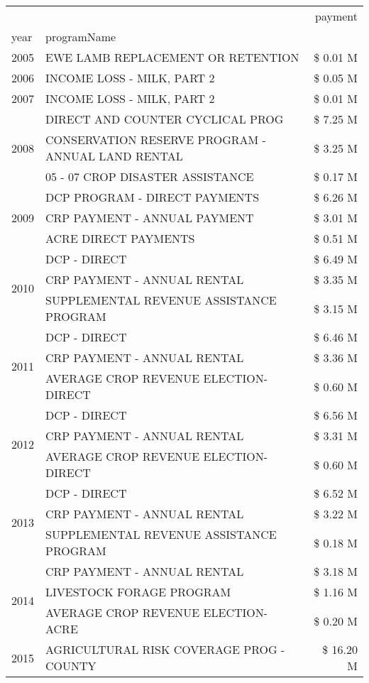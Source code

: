 \begin{tabular}{llr}
\toprule
 &  & payment \\
year & programName &  \\
\midrule
2005 & EWE LAMB REPLACEMENT OR RETENTION & \$ 0.01 M \\
\cline{1-3}
2006 & INCOME LOSS - MILK, PART 2 & \$ 0.05 M \\
\cline{1-3}
2007 & INCOME LOSS - MILK, PART 2 & \$ 0.01 M \\
\cline{1-3}
\multirow[t]{3}{*}{2008} & DIRECT AND COUNTER CYCLICAL PROG & \$ 7.25 M \\
 & CONSERVATION RESERVE PROGRAM - ANNUAL LAND RENTAL & \$ 3.25 M \\
 & 05 - 07 CROP DISASTER ASSISTANCE & \$ 0.17 M \\
\cline{1-3}
\multirow[t]{3}{*}{2009} & DCP PROGRAM - DIRECT PAYMENTS & \$ 6.26 M \\
 & CRP PAYMENT - ANNUAL PAYMENT & \$ 3.01 M \\
 & ACRE DIRECT PAYMENTS & \$ 0.51 M \\
\cline{1-3}
\multirow[t]{3}{*}{2010} & DCP - DIRECT & \$ 6.49 M \\
 & CRP PAYMENT - ANNUAL RENTAL & \$ 3.35 M \\
 & SUPPLEMENTAL REVENUE ASSISTANCE PROGRAM & \$ 3.15 M \\
\cline{1-3}
\multirow[t]{3}{*}{2011} & DCP - DIRECT & \$ 6.46 M \\
 & CRP PAYMENT - ANNUAL RENTAL & \$ 3.36 M \\
 & AVERAGE CROP REVENUE ELECTION-DIRECT & \$ 0.60 M \\
\cline{1-3}
\multirow[t]{3}{*}{2012} & DCP - DIRECT & \$ 6.56 M \\
 & CRP PAYMENT - ANNUAL RENTAL & \$ 3.31 M \\
 & AVERAGE CROP REVENUE ELECTION-DIRECT & \$ 0.60 M \\
\cline{1-3}
\multirow[t]{3}{*}{2013} & DCP - DIRECT & \$ 6.52 M \\
 & CRP PAYMENT - ANNUAL RENTAL & \$ 3.22 M \\
 & SUPPLEMENTAL REVENUE ASSISTANCE PROGRAM & \$ 0.18 M \\
\cline{1-3}
\multirow[t]{3}{*}{2014} & CRP PAYMENT - ANNUAL RENTAL & \$ 3.18 M \\
 & LIVESTOCK FORAGE PROGRAM & \$ 1.16 M \\
 & AVERAGE CROP REVENUE ELECTION-ACRE & \$ 0.20 M \\
\cline{1-3}
\multirow[t]{3}{*}{2015} & AGRICULTURAL RISK COVERAGE PROG - COUNTY & \$ 16.20 M \\

\end{tabular}
